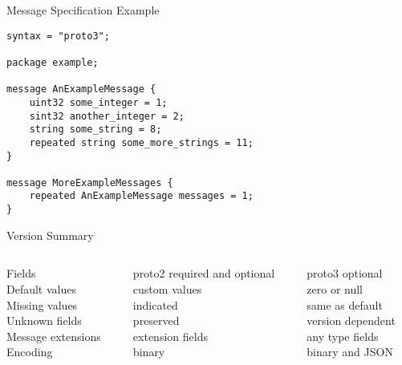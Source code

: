 \begin{frame}[fragile]{Message Specification Example}
\begin{lstlisting}[style=mini]
syntax = "proto3";

package example;

message AnExampleMessage {
    uint32 some_integer = 1;
    sint32 another_integer = 2;
    string some_string = 8;
    repeated string some_more_strings = 11;
}

message MoreExampleMessages {
    repeated AnExampleMessage messages = 1;
}
\end{lstlisting}
\end{frame}


\begin{frame}{Version Summary}
    \begin{columns}[b]
        \begin{column}{.3\textwidth}
            Fields \\
            Default values \\
            Missing values \\
            Unknown fields \\
            Message extensions \\
            Encoding \\
            \vspace{4pt}
        \end{column}
        \begin{column}{.3\textwidth}
            \begin{block}{proto2}
                required and optional \\
                custom values \\
                indicated \\
                preserved \\
                extension fields \\
                binary \\
            \end{block}
        \end{column}
        \begin{column}{.3\textwidth}
            \begin{block}{proto3}
                optional \\
                zero or null \\
                same as default \\
                version dependent \\
                any type fields \\
                binary and JSON \\
            \end{block}
        \end{column}
    \end{columns}
\end{frame}


